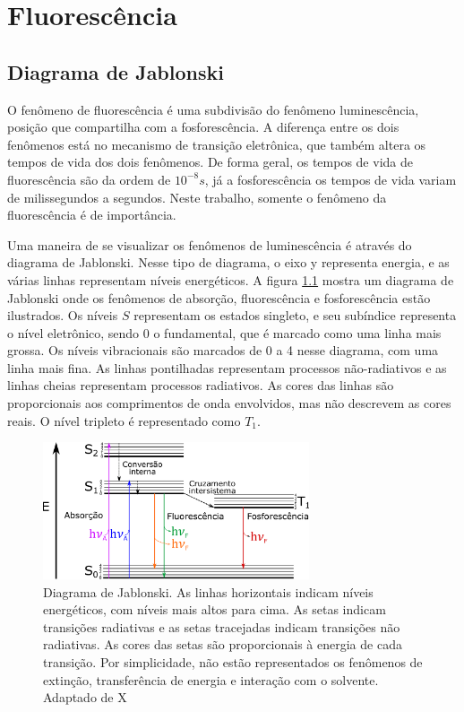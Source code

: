 	\chapter{Fluorescência}
		\section{Diagrama de Jablonski}
		
		O fenômeno de fluorescência é uma subdivisão do fenômeno luminescência, posição que compartilha com a fosforescência. A diferença entre os dois fenômenos está no mecanismo de transição eletrônica, que também altera os tempos de vida dos dois fenômenos. De forma geral, os tempos de vida de fluorescência são da ordem de \(10^{-8} s\), já a fosforescência os tempos de vida variam de milissegundos a segundos. Neste trabalho, somente o fenômeno da fluorescência é de importância.
		
		Uma maneira de se visualizar os fenômenos de luminescência é através do diagrama de Jablonski. Nesse tipo de diagrama, o eixo y representa energia, e as várias linhas representam níveis energéticos. A figura \ref{fig:diagrama_jablonski} mostra um diagrama de Jablonski onde os fenômenos de absorção, fluorescência e fosforescência estão ilustrados. Os níveis \(S\) representam os estados singleto, e seu subíndice representa o nível eletrônico, sendo 0 o fundamental, que é marcado como uma linha mais grossa. Os níveis vibracionais são marcados de 0 a 4 nesse diagrama, com uma linha mais fina. As linhas pontilhadas representam processos não-radiativos e as linhas cheias representam processos radiativos. As cores das linhas são proporcionais aos comprimentos de onda envolvidos, mas não descrevem as cores reais. O nível tripleto é representado como \(T_1\).  %
		
		\begin{figure}[h]
			\centering
			\includegraphics[width=0.7\textwidth]{imagens/fluor/diagrama_jablonski}
			\caption[Diagrama de Jablonski]{Diagrama de Jablonski. As linhas horizontais indicam níveis energéticos, com níveis mais altos para cima. As setas indicam transições radiativas e as setas tracejadas indicam transições não radiativas. As cores das setas são proporcionais à energia de cada transição. Por simplicidade, não estão representados os fenômenos de extinção, transferência de energia e interação com o solvente. Adaptado de X}
			\label{fig:diagrama_jablonski}  %
		\end{figure}  
		
